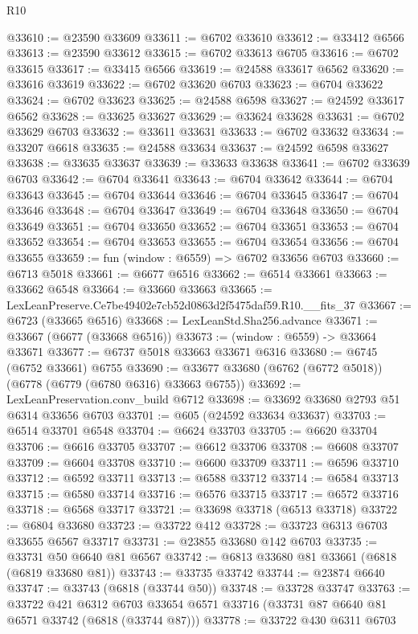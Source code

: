 \begin{lexlean}{R10}
\begin{coremodule}
@33610 := @23590 @33609
@33611 := @6702 @33610
@33612 := @33412 @6566
@33613 := @23590 @33612
@33615 := @6702 @33613 @6705
@33616 := @6702 @33615
@33617 := @33415 @6566
@33619 := @24588 @33617 @6562
@33620 := @33616 @33619
@33622 := @6702 @33620 @6703
@33623 := @6704 @33622
@33624 := @6702 @33623
@33625 := @24588 @6598
@33627 := @24592 @33617 @6562
@33628 := @33625 @33627
@33629 := @33624 @33628
@33631 := @6702 @33629 @6703
@33632 := @33611 @33631
@33633 := @6702 @33632
@33634 := @33207 @6618
@33635 := @24588 @33634
@33637 := @24592 @6598 @33627
@33638 := @33635 @33637
@33639 := @33633 @33638
@33641 := @6702 @33639 @6703
@33642 := @6704 @33641
@33643 := @6704 @33642
@33644 := @6704 @33643
@33645 := @6704 @33644
@33646 := @6704 @33645
@33647 := @6704 @33646
@33648 := @6704 @33647
@33649 := @6704 @33648
@33650 := @6704 @33649
@33651 := @6704 @33650
@33652 := @6704 @33651
@33653 := @6704 @33652
@33654 := @6704 @33653
@33655 := @6704 @33654
@33656 := @6704 @33655
@33659 := fun (window : @6559) => @6702 @33656 @6703
@33660 := @6713 @5018
@33661 := @6677 @6516
@33662 := @6514 @33661
@33663 := @33662 @6548
@33664 := @33660 @33663
@33665 := LexLeanPreserve.Ce7be49402e7cb52d0863d2f5475daf59.R10.__fits_37
@33667 := @6723 (@33665 @6516)
@33668 := LexLeanStd.Sha256.advance
@33671 := @33667 (@6677 (@33668 @6516))
@33673 := (window : @6559) -> @33664 @33671
@33677 := @6737 @5018 @33663 @33671 @6316
@33680 := @6745 (@6752 @33661) @6755
@33690 := @33677 @33680 (@6762 (@6772 @5018)) (@6778 (@6779 (@6780 @6316) @33663 @6755))
@33692 := LexLeanPreservation.conv_build @6712
@33698 := @33692 @33680 @2793 @51 @6314 @33656 @6703
@33701 := @605 (@24592 @33634 @33637)
@33703 := @6514 @33701 @6548
@33704 := @6624 @33703
@33705 := @6620 @33704
@33706 := @6616 @33705
@33707 := @6612 @33706
@33708 := @6608 @33707
@33709 := @6604 @33708
@33710 := @6600 @33709
@33711 := @6596 @33710
@33712 := @6592 @33711
@33713 := @6588 @33712
@33714 := @6584 @33713
@33715 := @6580 @33714
@33716 := @6576 @33715
@33717 := @6572 @33716
@33718 := @6568 @33717
@33721 := @33698 @33718 (@6513 @33718)
@33722 := @6804 @33680
@33723 := @33722 @412
@33728 := @33723 @6313 @6703 @33655 @6567 @33717
@33731 := @23855 @33680 @142 @6703
@33735 := @33731 @50 @6640 @81 @6567
@33742 := @6813 @33680 @81 @33661 (@6818 (@6819 @33680 @81))
@33743 := @33735 @33742
@33744 := @23874 @6640
@33747 := @33743 (@6818 (@33744 @50))
@33748 := @33728 @33747
@33763 := @33722
    @421
    @6312
    @6703
    @33654
    @6571
    @33716
    (@33731 @87 @6640 @81 @6571 @33742 (@6818 (@33744 @87)))
@33778 := @33722
    @430
    @6311
    @6703

\end{coremodule}
\end{lexlean}
